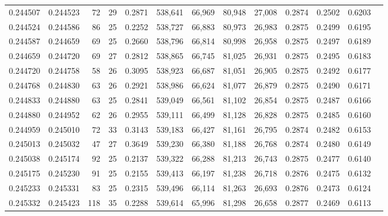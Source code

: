 \begin{tabular}{rrrrrrrrrrrrr}
0.244507 & 0.244523 &  72 &  29 &                                     0.2871 & 538,641 &  66,969 &  80,948 &  27,008 & 0.2874 & 0.2502 & 0.6203 \\
0.244524 & 0.244586 &  86 &  25 &                                     0.2252 & 538,727 &  66,883 &  80,973 &  26,983 & 0.2875 & 0.2499 & 0.6195 \\
0.244587 & 0.244659 &  69 &  25 &                                     0.2660 & 538,796 &  66,814 &  80,998 &  26,958 & 0.2875 & 0.2497 & 0.6189 \\
0.244659 & 0.244720 &  69 &  27 &                                     0.2812 & 538,865 &  66,745 &  81,025 &  26,931 & 0.2875 & 0.2495 & 0.6183 \\
0.244720 & 0.244758 &  58 &  26 &                                     0.3095 & 538,923 &  66,687 &  81,051 &  26,905 & 0.2875 & 0.2492 & 0.6177 \\
0.244768 & 0.244830 &  63 &  26 &                                     0.2921 & 538,986 &  66,624 &  81,077 &  26,879 & 0.2875 & 0.2490 & 0.6171 \\
0.244833 & 0.244880 &  63 &  25 &                                     0.2841 & 539,049 &  66,561 &  81,102 &  26,854 & 0.2875 & 0.2487 & 0.6166 \\
0.244880 & 0.244952 &  62 &  26 &                                     0.2955 & 539,111 &  66,499 &  81,128 &  26,828 & 0.2875 & 0.2485 & 0.6160 \\
0.244959 & 0.245010 &  72 &  33 &                                     0.3143 & 539,183 &  66,427 &  81,161 &  26,795 & 0.2874 & 0.2482 & 0.6153 \\
0.245013 & 0.245032 &  47 &  27 &                                     0.3649 & 539,230 &  66,380 &  81,188 &  26,768 & 0.2874 & 0.2480 & 0.6149 \\
0.245038 & 0.245174 &  92 &  25 &                                     0.2137 & 539,322 &  66,288 &  81,213 &  26,743 & 0.2875 & 0.2477 & 0.6140 \\
0.245175 & 0.245230 &  91 &  25 &                                     0.2155 & 539,413 &  66,197 &  81,238 &  26,718 & 0.2876 & 0.2475 & 0.6132 \\
0.245233 & 0.245331 &  83 &  25 &                                     0.2315 & 539,496 &  66,114 &  81,263 &  26,693 & 0.2876 & 0.2473 & 0.6124 \\
0.245332 & 0.245423 & 118 &  35 &                                     0.2288 & 539,614 &  65,996 &  81,298 &  26,658 & 0.2877 & 0.2469 & 0.6113 \\

\end{tabular}
